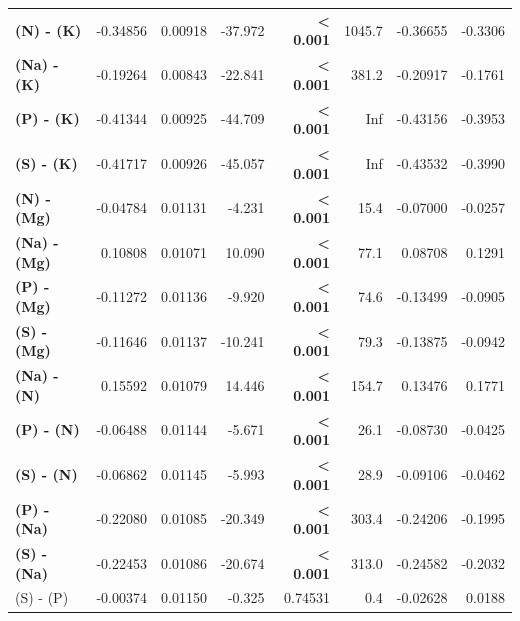 \begin{table}[H]
\begin{tabular}[t]{>{}lrrr>{}rrrr}
\textbf{(N) - (K)} & -0.34856 & 0.00918 & -37.972 & \textbf{< 0.001} & 1045.7 & -0.36655 & -0.3306\\
\textbf{(Na) - (K)} & -0.19264 & 0.00843 & -22.841 & \textbf{< 0.001} & 381.2 & -0.20917 & -0.1761\\
\textbf{(P) - (K)} & -0.41344 & 0.00925 & -44.709 & \textbf{< 0.001} & Inf & -0.43156 & -0.3953\\
\textbf{(S) - (K)} & -0.41717 & 0.00926 & -45.057 & \textbf{< 0.001} & Inf & -0.43532 & -0.3990\\
\textbf{(N) - (Mg)} & -0.04784 & 0.01131 & -4.231 & \textbf{< 0.001} & 15.4 & -0.07000 & -0.0257\\
\textbf{(Na) - (Mg)} & 0.10808 & 0.01071 & 10.090 & \textbf{< 0.001} & 77.1 & 0.08708 & 0.1291\\
\textbf{(P) - (Mg)} & -0.11272 & 0.01136 & -9.920 & \textbf{< 0.001} & 74.6 & -0.13499 & -0.0905\\
\textbf{(S) - (Mg)} & -0.11646 & 0.01137 & -10.241 & \textbf{< 0.001} & 79.3 & -0.13875 & -0.0942\\
\textbf{(Na) - (N)} & 0.15592 & 0.01079 & 14.446 & \textbf{< 0.001} & 154.7 & 0.13476 & 0.1771\\
\textbf{(P) - (N)} & -0.06488 & 0.01144 & -5.671 & \textbf{< 0.001} & 26.1 & -0.08730 & -0.0425\\
\textbf{(S) - (N)} & -0.06862 & 0.01145 & -5.993 & \textbf{< 0.001} & 28.9 & -0.09106 & -0.0462\\
\textbf{(P) - (Na)} & -0.22080 & 0.01085 & -20.349 & \textbf{< 0.001} & 303.4 & -0.24206 & -0.1995\\
\textbf{(S) - (Na)} & -0.22453 & 0.01086 & -20.674 & \textbf{< 0.001} & 313.0 & -0.24582 & -0.2032\\
(S) - (P) & -0.00374 & 0.01150 & -0.325 & 0.74531 & 0.4 & -0.02628 & 0.0188\\
\bottomrule
\end{tabular}
\end{table}
